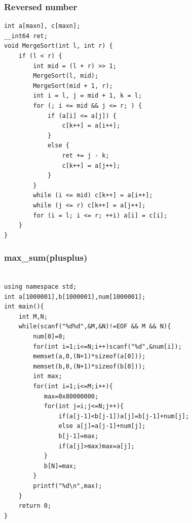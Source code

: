 \documentclass[a4paper]{article}
\begin{document}
\begin{CJK*}{UTF8}{gbsn}
\begin{multicols}{3}
\begin{flushleft}
\subsubsection{Reversed number}
\begin{lstlisting}
int a[maxn], c[maxn];
__int64 ret;
void MergeSort(int l, int r) {
    if (l < r) {
        int mid = (l + r) >> 1;
        MergeSort(l, mid);
        MergeSort(mid + 1, r);
        int i = l, j = mid + 1, k = l;
        for (; i <= mid && j <= r; ) {
            if (a[i] <= a[j]) {
                c[k++] = a[i++];
            }
            else {
                ret += j - k;
                c[k++] = a[j++];
            }
        }
        while (i <= mid) c[k++] = a[i++];
        while (j <= r) c[k++] = a[j++];
        for (i = l; i <= r; ++i) a[i] = c[i];
    }
}
\end{lstlisting}

\subsubsection{max\_sum(plusplus)}
\begin{lstlisting}

using namespace std;
int a[1000001],b[1000001],num[1000001];
int main(){
    int M,N;
    while(scanf("%d%d",&M,&N)!=EOF && M && N){
        num[0]=0;
        for(int i=1;i<=N;i++)scanf("%d",&num[i]);
        memset(a,0,(N+1)*sizeof(a[0]));
        memset(b,0,(N+1)*sizeof(b[0]));
        int max;
        for(int i=1;i<=M;i++){
           max=0x80000000;
           for(int j=i;j<=N;j++){
               if(a[j-1]<b[j-1])a[j]=b[j-1]+num[j];
               else a[j]=a[j-1]+num[j];
               b[j-1]=max;
               if(a[j]>max)max=a[j];
           }
           b[N]=max;
        }
        printf("%d\n",max);
    }
    return 0;
}
\end{lstlisting}

\end{flushleft}
\end{multicols}
\end{CJK*}
\end{document}
